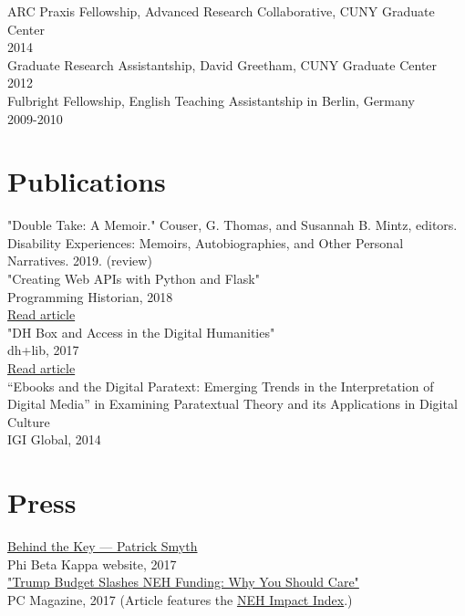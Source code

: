 \documentclass[11pt]{article}
\begin{document}
ARC Praxis Fellowship, Advanced Research Collaborative, CUNY Graduate Center\\
2014\\

Graduate Research Assistantship, David Greetham, CUNY Graduate Center\\
2012\\

Fulbright Fellowship, English Teaching Assistantship in Berlin, Germany\\
2009-2010\\

\section*{Publications}
\label{sec:orgheadline4}
"Double Take: A Memoir." Couser, G. Thomas, and Susannah B. Mintz, editors. Disability Experiences: Memoirs, Autobiographies, and Other Personal Narratives. 2019. (review)\\

"Creating Web APIs with Python and Flask"\\
Programming Historian, 2018\\
\href{https://programminghistorian.org/lessons/creating-apis-with-python-and-flask}{Read article}\\

"DH Box and Access in the Digital Humanities"\\
dh+lib, 2017\\
\href{http://acrl.ala.org/dh/2017/06/21/dh-box-and-access-in-the-digital-humanities/}{Read article}\\

“Ebooks and the Digital Paratext: Emerging Trends in the Interpretation of Digital Media” in Examining Paratextual Theory and its Applications in Digital Culture\\
IGI Global, 2014\\


\section*{Press}
\label{sec:orgheadline5}
\href{https://www.pbk.org/Behind-the-Key/Patrick-Smyth}{Behind the Key — Patrick Smyth}\\
Phi Beta Kappa website, 2017\\

\href{http://www.pcmag.com/commentary/353904/trump-budget-slashes-neh-funding-why-you-should-care}{"Trump Budget Slashes NEH Funding: Why You Should Care"}\\
PC Magazine, 2017 (Article features the \href{http://www.nehimpact.org/}{NEH Impact Index}.)\\
\end{document}
